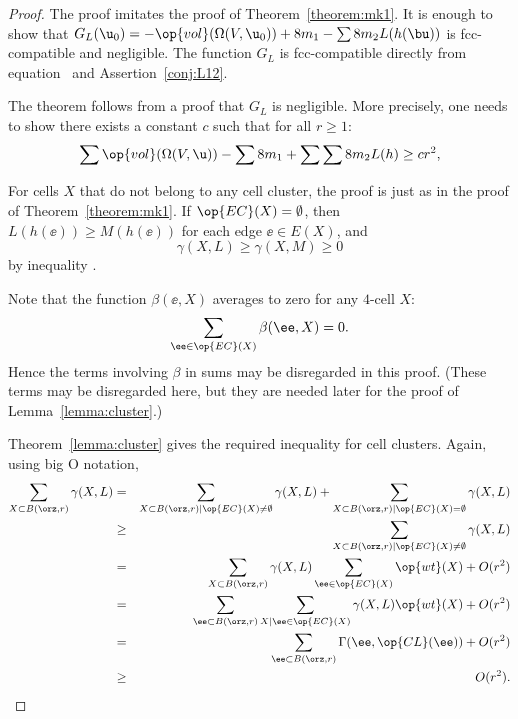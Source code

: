 \begin{proof} The proof imitates the proof of
Theorem~\ref{theorem:mk1}.  It is enough to show that $G_L( \u_0) =
-\op{vol}(\Omega(V, \u_0)) + 8 m_1 - \sum 8 m_2 L(h(\bu))$ is
fcc-compatible and negligible.  The function $G_L$ is fcc-compatible
directly from equation~ and Assertion~\ref{conj:L12}.

The theorem follows from a proof that $G_L$ is negligible.  More
precisely, one needs to show there exists a constant $c$ such that
for all $r\ge 1$:%
\begin{equation}\label{eqn:A2neg} 
\sum \op{vol}(\Omega(V, \u)) -\sum 8m_1 + \sum \sum 8 m_2 L(h) \ge c r^2,
\end{equation}

For cells $X$ that do not belong to any cell cluster,
the proof is just as in the proof of Theorem~\ref{theorem:mk1}.
If $\op{EC}(X)=\emptyset$, then 
$L(h(\ee))\ge M(h(\ee))$ for each edge $\ee\in E(X)$, and
\begin{displaymath}\gamma(X,L)\ge \gamma(X,M)\ge 0\end{displaymath} 
by inequality .

Note that the function $\beta(\ee,X)$ averages to zero for any $4$-cell $X$:
\begin{displaymath} 
\sum_{\ee\in \op{EC}(X)} \beta(\ee,X) = 0.
\end{displaymath}
Hence the terms involving $\beta$ in sums may be disregarded in this proof.
(These terms may be disregarded here, but they are
needed later for the proof of Lemma~\ref{lemma:cluster}.)

Theorem~\ref{lemma:cluster} gives the required inequality for cell
clusters.  Again, using big O notation,
\begin{eqnarray*} 
\sum_{X\subset B(\orz,r)} \gamma(X,L) &=&
\sum_{X\subset B(\orz,r)\mid \op{EC}(X)\ne\emptyset} \gamma(X,L) +
\sum_{X\subset B(\orz,r)\mid \op{EC}(X)=\emptyset} \gamma(X,L) \vspace{6pt}\\
&\ge& \sum_{X\subset B(\orz,r)\mid \op{EC}(X)\ne\emptyset} \gamma(X,L)\vspace{6pt} \\
&=&\sum_{X\subset B(\orz,r)}\gamma(X,L)\sum_{\ee \in \op{EC}(X)}\op{wt}(X) + O(r^2)\vspace{6pt}\\
&=&\sum_{\ee\subset B(\orz,r)}\sum_{X\mid \ee \in \op{EC}(X)}\gamma(X,L)\op{wt}(X) + O(r^2)\vspace{6pt}\\
&=&\sum_{\ee\subset B(\orz,r)}\Gamma(\ee,\op{CL}(\ee)) + O(r^2)\vspace{6pt}\\
&\ge& ~~O(r^2).
\end{eqnarray*}



\end{proof}
